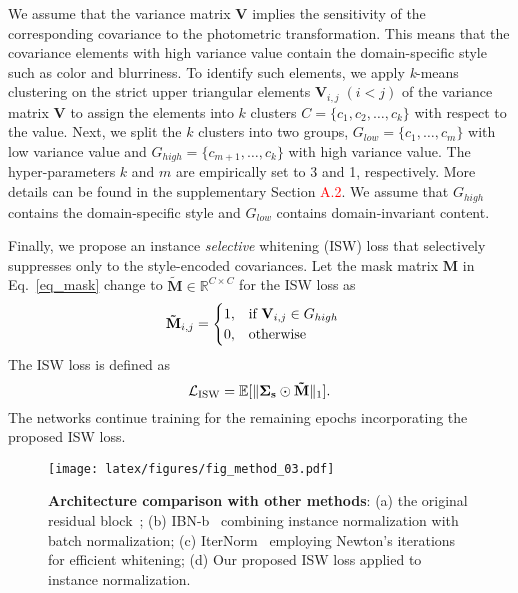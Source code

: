 \documentclass[final]{latex/cvpr}
\newcommand{\todow}[1]{\textcolor{red}{#1}}
\begin{document}
We assume that the variance matrix $\textbf{V}$ implies the sensitivity of the corresponding covariance to the photometric transformation. This means that the covariance elements with high variance value contain the domain-specific style such as color and blurriness.
To identify such elements, we apply \textit{k}-means clustering on the strict upper triangular elements $\mathbf{V}_{i,j}\; (i<j)$ of the variance matrix $\mathbf{V}$ to assign the elements into $k$ clusters $C=\{c_1, c_2,\dots,c_k\}$ with respect to the value. 
Next, we split the $k$ clusters into two groups, $G_{low}=\{c_1,\dots,c_m\}$ with low variance value and $G_{high}=\{c_{m+1},\dots,c_k\}$ with high variance value.
The hyper-parameters $k$ and $m$ are empirically set to 3 and 1, respectively. More details can be found in the supplementary Section \todow{A.2}.
We assume that $G_{high}$ contains the domain-specific style and $G_{low}$ contains domain-invariant content.


Finally, we propose an instance \emph{selective} whitening (ISW) loss that selectively suppresses only to the style-encoded covariances.
Let the mask matrix $\mathbf{{M}}$ in Eq.~\eqref{eq_mask} change to $\mathbf{\tilde{M}}\in\mathbb{R}^{C \times C}$ for the ISW loss as
\vspace{-0.1cm}
\begin{equation} \label{eq_selective_mask}
\mathbf{\tilde{M}}_{i,j} =\begin{cases}
 1, & \text{if $\mathbf{V}_{i,j}\in G_{high}$}\\
 0, & \text{otherwise}
\end{cases} \quad
\vspace*{-0.05cm}
\end{equation}
The ISW loss is defined as
\vspace*{-0.05cm}
\begin{equation} \label{eq_our_whitening_loss_selective}
\mathcal{L}_{\text{ISW}} = \mathbb{E}[\Vert\mathbf{\Sigma_s}\odot\mathbf{\tilde{M}}\Vert_1].
\vspace*{-0.05cm}
\end{equation}
The networks continue training for the remaining epochs incorporating the proposed ISW loss.

\begin{figure}[b!]
\vspace{-0.3cm}
\begin{center}
  \texttt{[image: latex/figures/fig\_method\_03.pdf]}
\end{center}
\vspace*{-0.3cm}
   \caption{\textbf{Architecture comparison with other methods}: (a) the original residual block~\cite{he2016deep}; (b) IBN-b~\cite{pan2018two} combining instance normalization with batch normalization; (c) IterNorm~\cite{huang2019iterative} employing Newton's iterations for efficient whitening; (d) Our proposed ISW loss applied to instance normalization.
}
\label{fig:architectural_comparison}
\end{figure}
\end{document}
